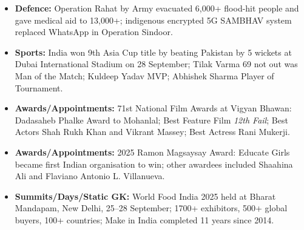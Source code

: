 \documentclass[10pt,a4paper]{article}
\begin{document}
\begin{itemize}
    \item \textbf{Defence:} Operation Rahat by Army evacuated 6,000+ flood-hit people and gave medical aid to 13,000+; indigenous encrypted 5G SAMBHAV system replaced WhatsApp in Operation Sindoor.
    \item \textbf{Sports:} India won 9th Asia Cup title by beating Pakistan by 5 wickets at Dubai International Stadium on 28 September; Tilak Varma 69 not out was Man of the Match; Kuldeep Yadav MVP; Abhishek Sharma Player of Tournament.
    \item \textbf{Awards/Appointments:} 71st National Film Awards at Vigyan Bhawan: Dadasaheb Phalke Award to Mohanlal; Best Feature Film \textit{12th Fail}; Best Actors Shah Rukh Khan and Vikrant Massey; Best Actress Rani Mukerji.
    \item \textbf{Awards/Appointments:} 2025 Ramon Magsaysay Award: Educate Girls became first Indian organisation to win; other awardees included Shaahina Ali and Flaviano Antonio L. Villanueva.
    \item \textbf{Summits/Days/Static GK:} World Food India 2025 held at Bharat Mandapam, New Delhi, 25--28 September; 1700+ exhibitors, 500+ global buyers, 100+ countries; Make in India completed 11 years since 2014.
\end{itemize}
\end{document}

